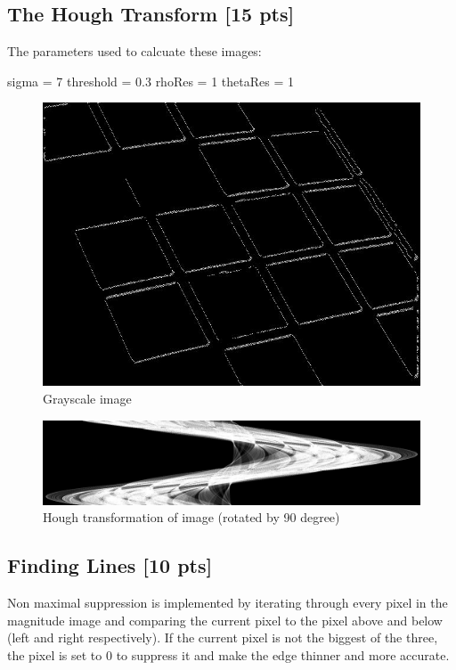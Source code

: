 \documentclass[12pt,a4paper]{article}
\begin{document}
\subsection{The Hough Transform [15 pts]}
The parameters used to calcuate these images:

sigma     = 7
threshold = 0.3
rhoRes    = 1
thetaRes  = 1

\begin{figure}[!h]
    \begin{center}
        \includegraphics[width=.5\textwidth]{assets/im.jpg}
        \caption{Grayscale image}
        \label{fig:grayscale}
    \end{center}
\end{figure}

\begin{figure}[!h]
    \begin{center}
        \includegraphics[width=1\textwidth]{assets/h.jpg}
        \caption{Hough transformation of image (rotated by 90 degree)}
        \label{fig:hough}
    \end{center}
\end{figure}



\subsection{Finding Lines [10 pts]}
Non maximal suppression is implemented by iterating through every pixel in the magnitude image and comparing the current pixel to the pixel above and below (left and right respectively). If the current pixel is not the biggest of the three, the pixel is set to 0 to suppress it and make the edge thinner and more accurate.
\end{document}
